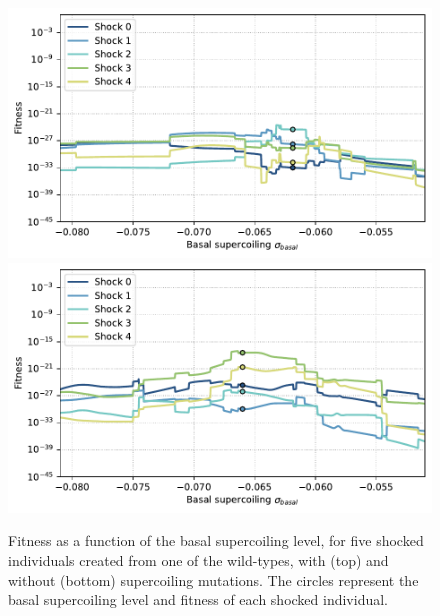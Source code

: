 \begin{figure}
\centering
\includegraphics[width=\textwidth]{epistasis/img/with-sc/fitness_landscapes_shuffled_wt_01.pdf}
\includegraphics[width=\textwidth]{epistasis/img/control/fitness_landscapes_shuffled_wt_01.pdf}
\caption[Supercoiling fitness landscapes after an environmental shock, with and without supercoiling mutations]{Fitness as a function of the basal supercoiling level, for five shocked individuals created from one of the wild-types, with (top) and without (bottom) supercoiling mutations.
The circles represent the basal supercoiling level and fitness of each shocked individual.}
\label{fig:epistasis:fitness-landscapes-shock}
\end{figure}

